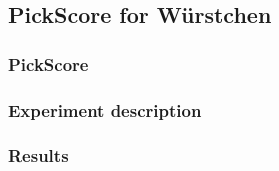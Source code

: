 \subsection{PickScore for W\"urstchen}
\subsubsection{PickScore}
\subsubsection{Experiment description}
\subsubsection{Results}